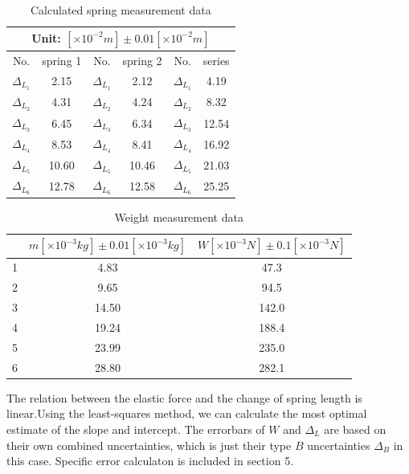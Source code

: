    \begin{table}[htbp]
        \centering
        \begin{tabular}{|c|c|c|c|c|c|}
            \hline
            \multicolumn{6}{|c|}{Unit: $[\times 10^{-2}m]\pm 0.01[\times 10^{-2}m]$}\\ \hline
            No. & spring 1 & No. & spring 2 & No. & series\\ \hline
            $\Delta_{L_1}$ & 2.15 & $\Delta_{L_1}$ & 2.12 & $\Delta_{L_1}$ & 4.19\\ \hline
            $\Delta_{L_2}$ & 4.31 & $\Delta_{L_2}$ & 4.24 & $\Delta_{L_2}$ & 8.32\\ \hline
            $\Delta_{L_3}$ & 6.45 & $\Delta_{L_3}$ & 6.34 & $\Delta_{L_3}$ & 12.54\\ \hline
            $\Delta_{L_4}$ & 8.53 & $\Delta_{L_4}$ & 8.41 & $\Delta_{L_4}$ & 16.92\\ \hline
            $\Delta_{L_5}$ & 10.60 & $\Delta_{L_5}$ & 10.46 & $\Delta_{L_5}$ & 21.03\\ \hline
            $\Delta_{L_6}$ & 12.78 & $\Delta_{L_6}$ & 12.58 & $\Delta_{L_6}$ & 25.25\\ \hline
        \end{tabular}
        \caption{Calculated spring measurement data}\label{spring*}
    \end{table}
    \begin{table}[htbp]
        \centering
        \begin{tabular}{|c|c|c|}
            \hline
            & $m[\times 10^{-3}kg]\pm 0.01[\times 10^{-3}kg]$ & $W[\times 10^{-3}N]\pm 0.1[\times 10^{-3}N]$\\ \hline
            1 & 4.83 & 47.3\\ \hline
            2 & 9.65 & 94.5\\ \hline
            3 & 14.50 & 142.0\\ \hline
            4 & 19.24 & 188.4\\ \hline
            5 & 23.99 & 235.0\\ \hline
            6 & 28.80 & 282.1\\ \hline            
        \end{tabular}
        \caption{Weight measurement data}\label{weight}
    \end{table}
    The relation between the elastic force and the change of spring length is linear.Using the least-squares method, we can calculate the most optimal estimate of the slope and intercept. The errorbars of $W$ and $\Delta_L$ are based on their own combined uncertainties, which is just their type $B$ uncertainties $\Delta_B$ in this case. Specific error calculaton is included in section 5.

